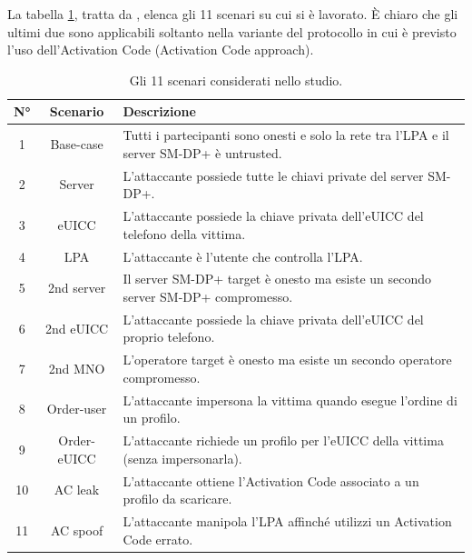 \documentclass[10pt, oneside]{book}
\begin{document}
La tabella \ref{tab:scenarios}, tratta da \cite{Sec-analysis}, elenca gli 11 scenari su cui si è lavorato. È chiaro che gli ultimi due sono applicabili soltanto nella variante del protocollo in cui è previsto l'uso dell'Activation Code (Activation Code approach).
\begin{table}[h!]
\begin{center}
\captionsetup{skip=4pt}
\caption{Gli 11 scenari considerati nello studio.}
\label{tab:scenarios}
\begin{tabularx}{\textwidth}{|c|c|X|} %
\hline
\textbf{N°} & \textbf{Scenario} & \textbf{Descrizione}\\
\hline
1 & Base-case & Tutti i partecipanti sono onesti e solo la rete tra l'LPA e il server SM-DP+ è untrusted.\\
\hline
2 & Server & L'attaccante possiede tutte le chiavi private del server SM-DP+.\\
\hline
3 & eUICC & L'attaccante possiede la chiave privata dell'eUICC del telefono della vittima.\\
\hline
4 & LPA & L'attaccante è l'utente che controlla l'LPA.\\
\hline
5 & 2nd server & Il server SM-DP+ target è onesto ma esiste un secondo server SM-DP+ compromesso.\\
\hline
6 & 2nd eUICC & L'attaccante possiede la chiave privata dell'eUICC del proprio telefono.\\
\hline
7 & 2nd MNO & L'operatore target è onesto ma esiste un secondo operatore compromesso.\\
\hline
8 & Order-user & L'attaccante impersona la vittima quando esegue l'ordine di un profilo.\\
\hline
9 & Order-eUICC & L'attaccante richiede un profilo per l'eUICC della vittima (senza impersonarla).\\
\hline
10 & AC leak & L'attaccante ottiene l'Activation Code associato a un profilo da scaricare.\\
\hline
11 & AC spoof & L'attaccante manipola l'LPA affinché utilizzi un Activation Code errato.\\
\hline
\end{tabularx}
\end{center}
\end{table}
\end{document}
